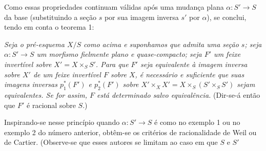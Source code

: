 Como essas propriedades continuam válidas após uma mudança plana
$\alpha:S'\longrightarrow S$ da base (substituindo a seção $s$ por sua
imagem inversa $s'$ por $\alpha$), se conclui, tendo em conta o teorema 1:

\emph{Seja o pré-esquema $X/S$ como acima e suponhamos que admita uma seção
$s$; seja $\alpha:S'\longrightarrow S$ um morfismo fielmente plano e
quase-compacto; seja $F'$ um feixe invertível sobre $X'=X\times_SS'$. Para que $F'$
seja equivalente à imagem inversa sobre $X'$ de um feixe invertível $F$ sobre
$X$, é necessário e suficiente que suas imagens inversas $p_1^*(F')$ e
$p_2^*(F')$ sobre $X'\times_XX'=X\times_S(S'\times_SS')$ sejam equivalentes. Se
for assim, $F$ está determinado salvo equivalência.} (Dir-se-á então que $F'$
é racional sobre $S$.)

Inspirando-se nesse princípio quando $\alpha:S'\longrightarrow S$ é como no
exemplo 1 ou no exemplo 2 do número anterior, obtêm-se os critérios de
racionalidade de Weil ou de Cartier. (Observe-se que esses autores se limitam ao
caso em que $S$ e $S'$


